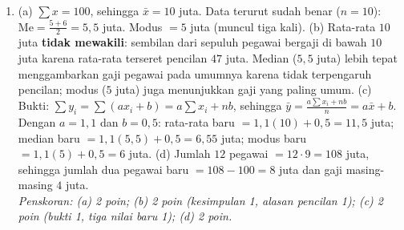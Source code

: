 \documentclass[a4paper,11pt]{article}
\newcommand{\dis}{\displaystyle}
\newcommand{\Me}{\mathrm{Me}}
\begin{document}
\begin{enumerate}[leftmargin=2em,itemsep=3pt,topsep=2pt]
\item[\textbf{5.}] (a) $\sum x=100$, sehingga $\bar{x}=10$ juta. Data terurut sudah benar ($n=10$): $\Me=\dis\frac{5+6}{2}=5{,}5$ juta. Modus $=5$ juta (muncul tiga kali). (b) Rata-rata $10$ juta \textbf{tidak mewakili}: sembilan dari sepuluh pegawai bergaji di bawah $10$ juta karena rata-rata terseret pencilan $47$ juta. Median ($5{,}5$ juta) lebih tepat menggambarkan gaji pegawai pada umumnya karena tidak terpengaruh pencilan; modus ($5$ juta) juga menunjukkan gaji yang paling umum. (c) Bukti: $\sum y_i=\sum(ax_i+b)=a\sum x_i+nb$, sehingga $\bar{y}=\dis\frac{a\sum x_i+nb}{n}=a\bar{x}+b$. Dengan $a=1{,}1$ dan $b=0{,}5$: rata-rata baru $=1{,}1(10)+0{,}5=11{,}5$ juta; median baru $=1{,}1(5{,}5)+0{,}5=6{,}55$ juta; modus baru $=1{,}1(5)+0{,}5=6$ juta. (d) Jumlah $12$ pegawai $=12\cdot9=108$ juta, sehingga jumlah dua pegawai baru $=108-100=8$ juta dan gaji masing-masing $4$ juta. \\ \textit{Penskoran: (a) 2 poin; (b) 2 poin (kesimpulan 1, alasan pencilan 1); (c) 2 poin (bukti 1, tiga nilai baru 1); (d) 2 poin.}
\end{enumerate}
\end{document}
